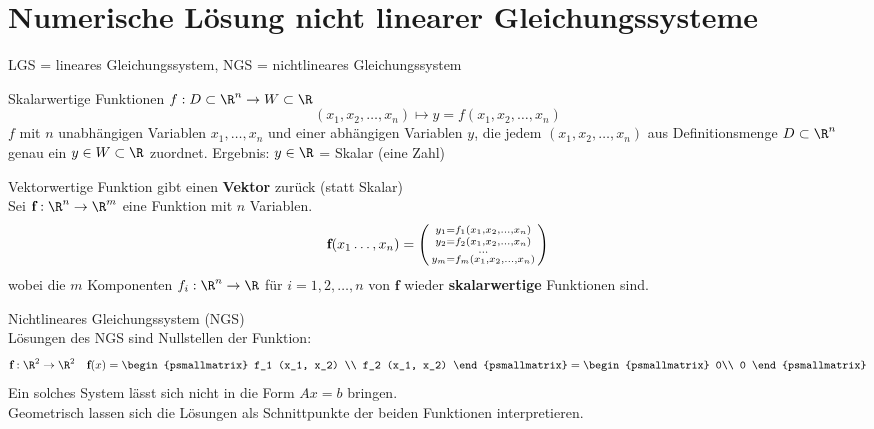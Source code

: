 \section{Numerische Lösung nicht linearer Gleichungssysteme}

\begin{remark}
    LGS = lineares Gleichungssystem, NGS = nichtlineares Gleichungssystem
\end{remark}



\raggedcolumns

\begin{definition}{Skalarwertige Funktionen}
    $f: D \subset \R^n \to W \subset \R$
    \vspace{-2mm}
    $$(x_1, x_2, \ldots, x_n) \mapsto y = f(x_1, x_2, \ldots, x_n)$$
    \small
    $f$ mit $n$ unabhängigen Variablen $x_1, \ldots, x_n$ und einer abhängigen Variablen $y$,
    die jedem $(x_1, x_2, \ldots, x_n)$ aus Definitionsmenge $D \subset \R^n$ genau ein $y \in W \subset \R$ zuordnet.
    Ergebnis: $y \in \R$ = Skalar (eine Zahl) 
\end{definition}

\begin{concept}{Vektorwertige Funktion} gibt einen \textbf{Vektor} zurück (statt Skalar)\\
    Sei $\textbf{f}: \R^n \to \R^m$ eine Funktion mit $n$ Variablen.
    \vspace{-2mm}
    $$\textbf{f}(x_1 \ldots, x_n) = \begin{psmallmatrix} y_1 = f_1(x_1, x_2, \ldots, x_n) \\ y_2 = f_2(x_1, x_2, \ldots, x_n) \\ ... \\ y_m = f_m(x_1, x_2, \ldots, x_n) \end{psmallmatrix}$$
    \small wobei die $m$ Komponenten $f_i: \R^n \to \R$ für $i = 1, 2, \ldots, n$ von $\textbf{f}$ wieder \textbf{skalarwertige} Funktionen sind.
\end{concept}

\begin{theorem}{Nichtlineares Gleichungssystem (NGS)}\\
    Lösungen des NGS sind Nullstellen der Funktion:
    \vspace{-2mm}
    $$\textbf{f}: \R^2 \to \R^2 \quad \textbf{f}(x) = \begin{psmallmatrix} f_1 (x_1, x_2) \\ f_2 (x_1, x_2) \end{psmallmatrix} = \begin{psmallmatrix} 0\\ 0 \end{psmallmatrix}$$
    \small
    Ein solches System lässt sich nicht in die Form $Ax = b$ bringen. \\
    Geometrisch lassen sich die Lösungen als Schnittpunkte der beiden Funktionen interpretieren.
\end{theorem}

